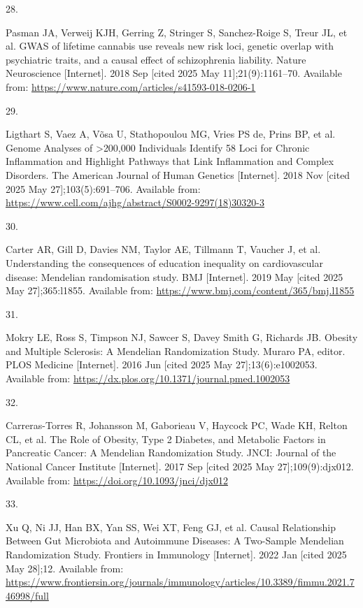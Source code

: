 \documentclass[
]{article}
\newlength{\cslhangindent}
\newlength{\csllabelwidth}
\newenvironment{CSLReferences}[2] %
 {\begin{list}{}{%
  \setlength{\itemindent}{0pt}
  \setlength{\leftmargin}{0pt}
  \setlength{\parsep}{0pt}
  \ifodd #1
   \setlength{\leftmargin}{\cslhangindent}
   \setlength{\itemindent}{-1\cslhangindent}
  \fi
  \setlength{\itemsep}{#2\baselineskip}}}
 {\end{list}}
\newcommand{\CSLLeftMargin}[1]{\parbox[t]{\csllabelwidth}{\strut#1\strut}}
\newcommand{\CSLRightInline}[1]{\parbox[t]{\linewidth - \csllabelwidth}{\strut#1\strut}}
\begin{document}
\begin{CSLReferences}{0}{1}
\CSLLeftMargin{28. }%
\CSLRightInline{Pasman JA, Verweij KJH, Gerring Z, Stringer S, Sanchez-Roige S, Treur JL, et al. {GWAS} of lifetime cannabis use reveals new risk loci, genetic overlap with psychiatric traits, and a causal effect of schizophrenia liability. Nature Neuroscience {[}Internet{]}. 2018 Sep {[}cited 2025 May 11{]};21(9):1161--70. Available from: \url{https://www.nature.com/articles/s41593-018-0206-1}}

\CSLLeftMargin{29. }%
\CSLRightInline{Ligthart S, Vaez A, Võsa U, Stathopoulou MG, Vries PS de, Prins BP, et al. Genome {Analyses} of {\textgreater{}}200,000 {Individuals} {Identify} 58 {Loci} for {Chronic} {Inflammation} and {Highlight} {Pathways} that {Link} {Inflammation} and {Complex} {Disorders}. The American Journal of Human Genetics {[}Internet{]}. 2018 Nov {[}cited 2025 May 27{]};103(5):691--706. Available from: \url{https://www.cell.com/ajhg/abstract/S0002-9297(18)30320-3}}

\CSLLeftMargin{30. }%
\CSLRightInline{Carter AR, Gill D, Davies NM, Taylor AE, Tillmann T, Vaucher J, et al. Understanding the consequences of education inequality on cardiovascular disease: Mendelian randomisation study. BMJ {[}Internet{]}. 2019 May {[}cited 2025 May 27{]};365:l1855. Available from: \url{https://www.bmj.com/content/365/bmj.l1855}}

\CSLLeftMargin{31. }%
\CSLRightInline{Mokry LE, Ross S, Timpson NJ, Sawcer S, Davey Smith G, Richards JB. Obesity and {Multiple} {Sclerosis}: {A} {Mendelian} {Randomization} {Study}. Muraro PA, editor. PLOS Medicine {[}Internet{]}. 2016 Jun {[}cited 2025 May 27{]};13(6):e1002053. Available from: \url{https://dx.plos.org/10.1371/journal.pmed.1002053}}

\CSLLeftMargin{32. }%
\CSLRightInline{Carreras-Torres R, Johansson M, Gaborieau V, Haycock PC, Wade KH, Relton CL, et al. The {Role} of {Obesity}, {Type} 2 {Diabetes}, and {Metabolic} {Factors} in {Pancreatic} {Cancer}: {A} {Mendelian} {Randomization} {Study}. JNCI: Journal of the National Cancer Institute {[}Internet{]}. 2017 Sep {[}cited 2025 May 27{]};109(9):djx012. Available from: \url{https://doi.org/10.1093/jnci/djx012}}

\CSLLeftMargin{33. }%
\CSLRightInline{Xu Q, Ni JJ, Han BX, Yan SS, Wei XT, Feng GJ, et al. Causal {Relationship} {Between} {Gut} {Microbiota} and {Autoimmune} {Diseases}: {A} {Two}-{Sample} {Mendelian} {Randomization} {Study}. Frontiers in Immunology {[}Internet{]}. 2022 Jan {[}cited 2025 May 28{]};12. Available from: \url{https://www.frontiersin.org/journals/immunology/articles/10.3389/fimmu.2021.746998/full}}


\end{CSLReferences}
\end{document}
